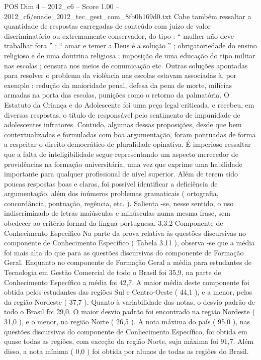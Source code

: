\begin{textsample}{POS Dim 4 – 2012\_c6 – Score 1.00 – 2012\_c6/enade\_2012\_tec\_gest\_com\_8fb0b169d0.txt}
Cabe também ressaltar a quantidade de respostas carregadas de conteúdo com juízo de valor discriminatório ou extremamente conservador, do tipo : “ mulher não deve trabalhar fora ” ; “ amar e temer a Deus é a solução ” ; obrigatoriedade do ensino religioso e de uma doutrina religiosa ; imposição de uma educação do tipo militar nas escolas ; censura nos meios de comunicação etc.
Outras soluções apontadas para resolver o problema da violência nas escolas estavam associadas à, por exemplo : redução da maioridade penal, defesa da pena de morte, milícias armadas na porta das escolas, punições como o retorno da palmatória.
O Estatuto da Criança e do Adolescente foi uma peça legal criticada, e recebeu, em diversas respostas, o título de responsável pelo sentimento de impunidade de adolescentes infratores.
Contudo, algumas dessas proposições, desde que bem contextualizadas e formuladas com boa argumentação, foram pontuadas de forma a respeitar o direito democrático de pluralidade opinativa.
É imperioso ressaltar que a falta de inteligibilidade segue representando um aspecto merecedor de providências na formação universitária, uma vez que exprime uma habilidade importante para qualquer profissional de nível superior.
Além de terem sido poucas respostas boas e claras, foi possível identificar a deficiência de argumentação, além dos inúmeros problemas gramaticais ( ortografia, concordância, pontuação, regência, etc. ).
Salienta -se, nesse sentido, o uso indiscriminado de letras maiúsculas e minúsculas numa mesma frase, sem obedecer ao critério formal da língua portuguesa. 3.3.2 Componente de Conhecimento Específico Na parte da prova relativa às questões discursivas no componente de Conhecimento Específico ( Tabela 3.11 ), observa -se que a média foi mais alta do que para as questões discursivas do componente de Formação Geral.
Enquanto no componente de Formação Geral a média para estudantes de Tecnologia em Gestão Comercial de todo o Brasil foi 35,9, na parte de Conhecimento Específico a média foi 42,7.
A maior média deste componente foi obtida pelos estudantes das regiões Sul e Centro-Oeste ( 44,1 ), e a menor, pelos da região Nordeste ( 37,7 ).
Quanto à variabilidade das notas, o desvio padrão de todo o Brasil foi 29,0.
O maior desvio padrão foi encontrado na região Nordeste ( 31,0 ), e o menor, na região Norte ( 26,5 ).
A nota máxima do país ( 95,0 ), nas questões discursivas do componente de Conhecimento Específico, foi obtida em quase todas as regiões, com exceção da região Norte, suja máxima foi 91,7.
Além disso, a nota mínima ( 0,0 ) foi obtida por alunos de todas as regiões do Brasil.

\end{textsample}
